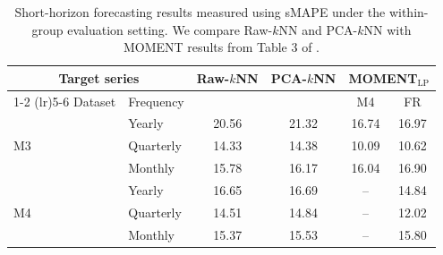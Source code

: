 \documentclass[12pt]{article}
\theoremstyle{definition}
\begin{document}
\begin{table}
  \caption{Short-horizon forecasting results measured using sMAPE under the within-group evaluation setting. We compare Raw-$k$NN and PCA-$k$NN with MOMENT results from Table 3 of \cite{goswami2024moment}.}
  \label{tab:short_horizon_results_within_group }
  \centering
  \small
  \begin{tabular}{@{}llcccc@{}}
    \toprule
    \multicolumn{2}{c}{Target series} &
    \multirow{2}{*}{Raw-$k$NN} &
    \multirow{2}{*}{PCA-$k$NN} &
    \multicolumn{2}{c}{MOMENT$_{\mathrm{LP}}$} \\
    \cmidrule(lr){1-2}
    \cmidrule(lr){5-6}
    Dataset & Frequency & & & M4 & FR \\
    \midrule
    \multirow{3}{*}{M3}
      & Yearly    & 20.56 & 21.32 & 16.74 & 16.97 \\
      & Quarterly & 14.33 & 14.38 & 10.09 & 10.62 \\
      & Monthly   & 15.78 & 16.17 & 16.04 & 16.90 \\
    \midrule
    \multirow{3}{*}{M4}
      & Yearly    & 16.65 & 16.69 & --    & 14.84 \\
      & Quarterly & 14.51 & 14.84 & --    & 12.02 \\
      & Monthly   & 15.37 & 15.53 & --    & 15.80 \\
    \bottomrule
  \end{tabular}
\end{table}



\end{document}
